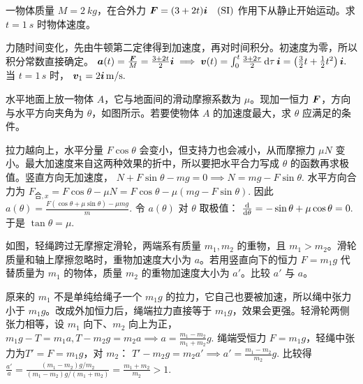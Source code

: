 \documentclass[lang=cn,11pt]{elegantbook}
\begin{document}
\begin{exercise}
一物体质量 \(M=\SI{2}{kg}\)，在合外力
 \(\vb*{F}=(3+2t)\vb*{i}\quad(\mathrm{SI})\) 
作用下从静止开始运动。求 \(t=\SI{1}{s}\) 时物体速度。
\end{exercise}
\begin{solution}
力随时间变化，先由牛顿第二定律得到加速度，再对时间积分。初速度为零，所以积分常数直接确定。
 \(\vb*{a}(t)=\frac{\vb*{F}}{M} =\frac{3+2t}{2}\vb*{i}\implies \vb*{v}(t)=\int_0^t \frac{3+2\tau}{2}\,\dd\tau\,\vb*{i} =\left(\frac32t+\frac12t^2\right)\vb*{i}.\) 
当 \(t=1\,\si{s}\) 时，
 \(\vb*{v}_1=2\vb*{i}\,\si{m/s}.\) 
\end{solution}


\begin{exercise}
水平地面上放一物体 \(A\)，它与地面间的滑动摩擦系数为 \(\mu\)。现加一恒力 \(\vb*{F}\)，方向与水平方向夹角为 \(\theta\)，如图所示。若要使物体 \(A\) 的加速度最大，求 \(\theta\) 应满足的条件。
\end{exercise}
\begin{solution}
拉力越向上，水平分量 \(F\cos\theta\) 会变小，但支持力也会减小，从而摩擦力 \(\mu N\) 变小。最大加速度来自这两种效果的折中，所以要把水平合力写成 \(\theta\) 的函数再求极值。竖直方向无加速度，
 \(N+F\sin\theta-mg=0 \implies N=mg-F\sin\theta.\) 
水平方向合力为
 \(F_{\text{合},x}=F\cos\theta-\mu N =F\cos\theta-\mu(mg-F\sin\theta).\) 
因此
 \(a(\theta)=\frac{F(\cos\theta+\mu\sin\theta)-\mu mg}{m}.\) 
令 \(a(\theta)\) 对 \(\theta\) 取极值：
 \(\dv{}{\theta}(\cos\theta+\mu\sin\theta) =-\sin\theta+\mu\cos\theta=0.\) 
于是
 \(\tan\theta=\mu.\) 
\end{solution}

\begin{exercise}
如图，轻绳跨过无摩擦定滑轮，两端系有质量 \(m_1,m_2\) 的重物，且 \(m_1>m_2\)。滑轮质量和轴上摩擦忽略时，重物加速度大小为 \(a\)。若用竖直向下的恒力 \(F=m_1g\) 代替质量为 \(m_1\) 的物体，质量 \(m_2\) 的重物加速度大小为 \(a'\)。比较 \(a'\) 与 \(a\)。
\end{exercise}
\begin{solution}
 原来的 \(m_1\) 不是单纯给绳子一个 \(m_1g\) 的拉力，它自己也要被加速，所以绳中张力小于 \(m_1g\)。改成外加恒力后，绳端拉力直接等于 \(m_1g\)，效果会更强。轻滑轮两侧张力相等，设 \(m_1\) 向下、\(m_2\) 向上为正，
 \(m_1g-T=m_1a, T-m_2g=m_2a\implies a=\frac{m_1-m_2}{m_1+m_2}g.\) 
绳端受恒力 \(F=m_1g\)，轻绳中张力为$T'=F=m_1g$，对 \(m_2\)：
 \(T'-m_2g=m_2a' \implies a'=\frac{m_1-m_2}{m_2}g.\) 
比较得
 \(\frac{a'}{a} =\frac{(m_1-m_2)g/m_2}{(m_1-m_2)g/(m_1+m_2)} =\frac{m_1+m_2}{m_2}>1.\) 
\end{solution}
\end{document}
